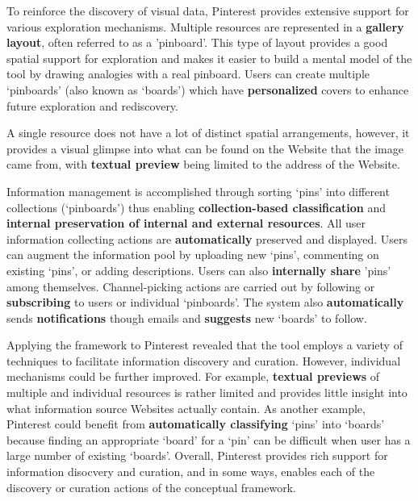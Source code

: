 {To reinforce the discovery of visual data, Pinterest provides extensive support for various exploration mechanisms. Multiple resources are represented in a \textbf{gallery layout}, often referred to as a 'pinboard'. This type of layout provides a good spatial support for exploration and makes it easier to build a mental model of the tool by drawing analogies with a real pinboard. Users can create multiple `pinboards' (also known as `boards') which have \textbf{personalized} covers to enhance future exploration and rediscovery.

A single resource does not have a lot of distinct spatial arrangements, however, it provides a visual glimpse into what can be found on the Website that the image came from, with \textbf{textual preview} being limited to the address of the Website. 

Information management is accomplished through sorting `pins' into different collections (`pinboards') thus enabling \textbf{collection-based classification} and \textbf{internal preservation of internal and external resources}. All user information collecting actions are \textbf{automatically} preserved and displayed. Users can augment the information pool by uploading new `pins', commenting on existing `pins', or adding descriptions. Users can also \textbf{internally share} 'pins' among themselves. Channel-picking actions are carried out by following or \textbf{subscribing} to users or individual `pinboards'. The system also \textbf{automatically} sends \textbf{notifications} though emails and \textbf{suggests} new `boards' to follow.

Applying the framework to Pinterest revealed that the tool employs a  variety of techniques to facilitate information discovery and curation. However, individual mechanisms could be further improved. For example, \textbf{textual previews} of multiple and individual resources is rather limited and provides little insight into what information source Websites actually contain. As another example, Pinterest could benefit from \textbf{automatically classifying} `pins' into `boards' because finding an appropriate `board' for a `pin' can be difficult when user has a large number of existing `boards'. Overall, Pinterest provides rich support for information disocvery and curation, and in some ways, enables each of the discovery or curation actions of the conceptual framework. 
} %


